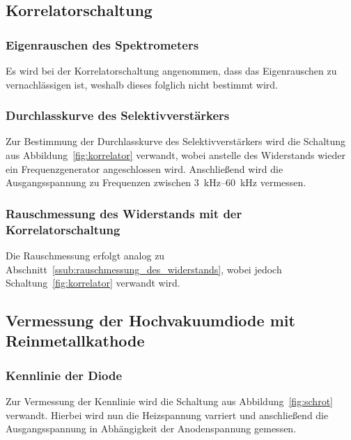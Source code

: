 \subsection{Korrelatorschaltung}
\label{sub:korrelatorschaltung}

\subsubsection{Eigenrauschen des Spektrometers}
\label{ssub:eigenrauschen_des_spektrometers}

Es wird bei der Korrelatorschaltung angenommen, dass das Eigenrauschen zu
vernachlässigen ist, weshalb dieses folglich nicht bestimmt wird.

\subsubsection{Durchlasskurve des Selektivverstärkers}
\label{ssub:durchlasskurve_des_selektivverstärkers}

Zur Bestimmung der Durchlasskurve des Selektivverstärkers wird die Schaltung
aus Abbildung~\ref{fig:korrelator} verwandt, wobei anstelle des Widerstands
wieder ein Frequenzgenerator angeschlossen wird.
Anschließend wird die Ausgangsspannung zu Frequenzen zwischen
\SIrange{3}{60}{\kilo\hertz} vermessen.

\subsubsection{Rauschmessung des Widerstands mit der Korrelatorschaltung}
\label{ssub:rauschmessung_des_widerstands_mit_der_korrelatorschaltung}

Die Rauschmessung erfolgt analog zu
Abschnitt~\ref{ssub:rauschmessung_des_widerstands}, wobei jedoch
Schaltung~\ref{fig:korrelator} verwandt wird.

\subsection{Vermessung der Hochvakuumdiode mit Reinmetallkathode}
\label{sub:vermessung_der_hochvakuumdiode_mit_reinmetallkathode}

\subsubsection{Kennlinie der Diode}
\label{ssub:kennlinie_der_diode}

Zur Vermessung der Kennlinie wird die Schaltung aus Abbildung~\ref{fig:schrot}
verwandt. Hierbei wird nun die Heizspannung varriert und anschließend die
Ausgangsspannung in Abhängigkeit der Anodenspannung gemessen.

